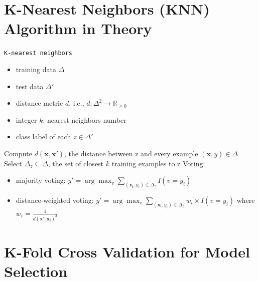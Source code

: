 \documentclass{article}
\newcommand{\argmax}{\arg\!\max}
\begin{document}
\section*{K-Nearest Neighbors (KNN) Algorithm in Theory}
{\small
\begin{center}
\begin{algorithmic}[1]\label{alg:knn}
 \texttt{K-nearest neighbors}
\begin{itemize}
\item \textsf{training data} $\Delta$
\item \textsf{test data} $\Delta'$  
\item \textsf{distance metric} $d$, i.e., $d:\Delta^2\rightarrow \mathbb{R}_{\geq 0}$ 
\item \textsf{integer} $k$: \textsf{nearest neighbors number}
\end{itemize}
\begin{itemize}
\item \textsf{class label of each} $z \in \Delta' $
\end{itemize}
\State  \textsf{Compute} $d(\mathbf{x},\mathbf{x}')$, \textsf{the distance between z and every example} $(\mathbf{x},y) \in \Delta$
\State  \textsf{Select} $\Delta_z \subseteq \Delta$, \textsf{the set of closest} $k$ \textsf{training examples to z}
\State \textsf{Voting:}
\begin{itemize}
\item \textsf{majority voting}:
$y' = \argmax_v  \sum_{(\mathbf{x_i},y_i)\in\Delta_z} I(v=y_i)$
\item \textsf{distance-weighted voting}: $y' = \argmax_v  \sum_{(\mathbf{x_i},y_i)\in\Delta_z} w_i \times I(v=y_i)$ \textsf{where} $ w_i = \frac{1}{d(\mathbf{x',x_i})^2}$
\end{itemize}
\EndFor
\end{algorithmic}
\end{center}}

\pagebreak

\section*{K-Fold Cross Validation for Model Selection }
\end{document}
